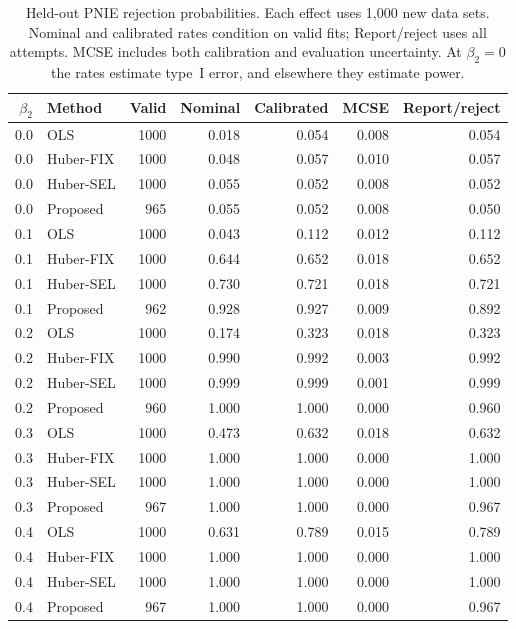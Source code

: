 \begin{table}[htbp]
\centering\small
\caption{Held-out PNIE rejection probabilities. Each effect uses 1,000 new data sets. Nominal and calibrated rates condition on valid fits; Report/reject uses all attempts. MCSE includes both calibration and evaluation uncertainty. At $\beta_2=0$ the rates estimate type~I error, and elsewhere they estimate power.}
\label{tab:power-calibrated}
\begin{tabular}{rlrrrrr}
\toprule
$\beta_2$ & Method & Valid & Nominal & Calibrated & MCSE & Report/reject \\ \midrule
0.0 & OLS & 1000 & 0.018 & 0.054 & 0.008 & 0.054 \\
0.0 & Huber-FIX & 1000 & 0.048 & 0.057 & 0.010 & 0.057 \\
0.0 & Huber-SEL & 1000 & 0.055 & 0.052 & 0.008 & 0.052 \\
0.0 & Proposed & 965 & 0.055 & 0.052 & 0.008 & 0.050 \\
\midrule
0.1 & OLS & 1000 & 0.043 & 0.112 & 0.012 & 0.112 \\
0.1 & Huber-FIX & 1000 & 0.644 & 0.652 & 0.018 & 0.652 \\
0.1 & Huber-SEL & 1000 & 0.730 & 0.721 & 0.018 & 0.721 \\
0.1 & Proposed & 962 & 0.928 & 0.927 & 0.009 & 0.892 \\
\midrule
0.2 & OLS & 1000 & 0.174 & 0.323 & 0.018 & 0.323 \\
0.2 & Huber-FIX & 1000 & 0.990 & 0.992 & 0.003 & 0.992 \\
0.2 & Huber-SEL & 1000 & 0.999 & 0.999 & 0.001 & 0.999 \\
0.2 & Proposed & 960 & 1.000 & 1.000 & 0.000 & 0.960 \\
\midrule
0.3 & OLS & 1000 & 0.473 & 0.632 & 0.018 & 0.632 \\
0.3 & Huber-FIX & 1000 & 1.000 & 1.000 & 0.000 & 1.000 \\
0.3 & Huber-SEL & 1000 & 1.000 & 1.000 & 0.000 & 1.000 \\
0.3 & Proposed & 967 & 1.000 & 1.000 & 0.000 & 0.967 \\
\midrule
0.4 & OLS & 1000 & 0.631 & 0.789 & 0.015 & 0.789 \\
0.4 & Huber-FIX & 1000 & 1.000 & 1.000 & 0.000 & 1.000 \\
0.4 & Huber-SEL & 1000 & 1.000 & 1.000 & 0.000 & 1.000 \\
0.4 & Proposed & 967 & 1.000 & 1.000 & 0.000 & 0.967 \\
\bottomrule\end{tabular}
\end{table}
